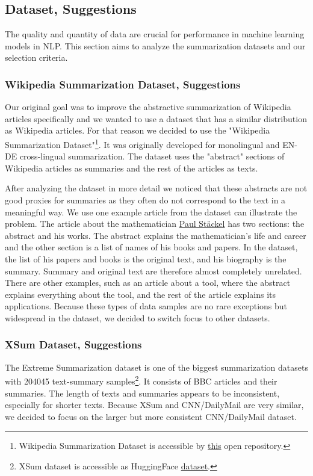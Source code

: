 \documentclass[11pt]{article}
\begin{document}
\subsection{Dataset, Suggestions}\label{subsection: dataset}

The quality and quantity of data are crucial for performance in machine learning models in NLP. This section aims to analyze the summarization datasets and our selection criteria.

\subsubsection{Wikipedia Summarization Dataset, Suggestions}
Our original goal was to improve the abstractive summarization of Wikipedia articles specifically and we wanted to use a dataset that has a similar distribution as Wikipedia articles. For that reason we decided to use the "Wikipedia Summarization Dataset"\footnote{Wikipedia Summarization Dataset is accessible by \href{https://github.com/mehwishfatimah/wsd}{this} open repository.}. It was originally developed for monolingual and EN-DE cross-lingual summarization. The dataset uses the "abstract" sections of Wikipedia articles as summaries and the rest of the articles as texts. 

After analyzing the dataset in more detail we noticed that these abstracts are not good proxies for summaries as they often do not correspond to the text in a meaningful way. We use one example article from the dataset can illustrate the problem. The article about the mathematician \href{https://en.wikipedia.org/wiki/Paul_St%C3%A4ckel}{Paul Stäckel} has two sections: the abstract and his works. The abstract explains the mathematician's life and career and the other section is a list of names of his books and papers. In the dataset, the list of his papers and books is the original text, and his biography is the summary. Summary and original text are therefore almost completely unrelated. There are other examples, such as an article about a tool, where the abstract explains everything about the tool, and the rest of the article explains its applications. Because these types of data samples are no rare exceptions but widespread in the dataset, we decided to switch focus to other datasets.

\subsubsection{XSum Dataset, Suggestions}
The Extreme Summarization dataset is one of the biggest summarization datasets with 204045 text-summary samples\footnote{XSum dataset is accessible as HuggingFace \href{https://huggingface.co/datasets/xsum}{dataset}.}. It consists of BBC articles and their summaries. The length of texts and summaries appears to be inconsistent, especially for shorter texts. Because XSum and CNN/DailyMail are very similar, we decided to focus on the larger but more consistent CNN/DailyMail dataset.
\end{document}
